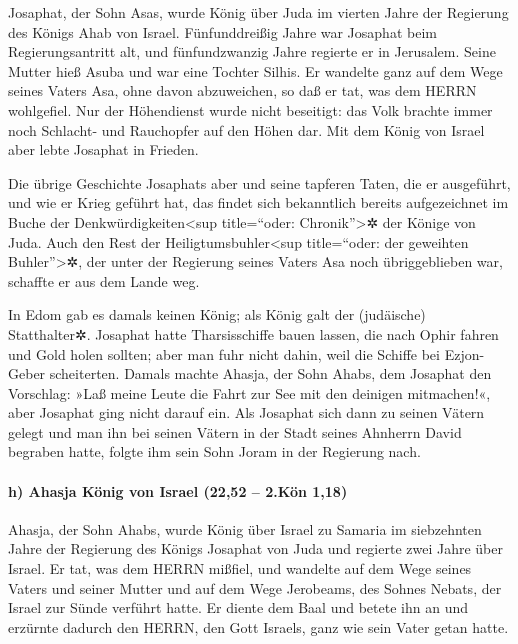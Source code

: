 Josaphat, der Sohn Asas, wurde König über Juda im vierten
Jahre der Regierung des Königs Ahab von Israel.
Fünfunddreißig Jahre war Josaphat beim Regierungsantritt
alt, und fünfundzwanzig Jahre regierte er in Jerusalem. Seine Mutter
hieß Asuba und war eine Tochter Silhis. Er wandelte ganz
auf dem Wege seines Vaters Asa, ohne davon abzuweichen, so daß er tat,
was dem HERRN wohlgefiel. Nur der Höhendienst wurde nicht
beseitigt: das Volk brachte immer noch Schlacht- und Rauchopfer auf den
Höhen dar. Mit dem König von Israel aber lebte Josaphat
in Frieden.

Die übrige Geschichte Josaphats aber und seine tapferen
Taten, die er ausgeführt, und wie er Krieg geführt hat, das findet sich
bekanntlich bereits aufgezeichnet im Buche der
Denkwürdigkeiten\textless sup title=``oder: Chronik''\textgreater✲ der
Könige von Juda. Auch den Rest der
Heiligtumsbuhler\textless sup title=``oder: der geweihten
Buhler''\textgreater✲, der unter der Regierung seines Vaters Asa noch
übriggeblieben war, schaffte er aus dem Lande weg.

In Edom gab es damals keinen König; als König galt der
(judäische) Statthalter✲. Josaphat hatte Tharsisschiffe
bauen lassen, die nach Ophir fahren und Gold holen sollten; aber man
fuhr nicht dahin, weil die Schiffe bei Ezjon-Geber scheiterten.
Damals machte Ahasja, der Sohn Ahabs, dem Josaphat den
Vorschlag: »Laß meine Leute die Fahrt zur See mit den deinigen
mitmachen!«, aber Josaphat ging nicht darauf ein. Als
Josaphat sich dann zu seinen Vätern gelegt und man ihn bei seinen Vätern
in der Stadt seines Ahnherrn David begraben hatte, folgte ihm sein Sohn
Joram in der Regierung nach.

\hypertarget{h-ahasja-kuxf6nig-von-israel-2252-2.kuxf6n-118}{%
\paragraph{h) Ahasja König von Israel (22,52 -- 2.Kön
1,18)}\label{h-ahasja-kuxf6nig-von-israel-2252-2.kuxf6n-118}}

Ahasja, der Sohn Ahabs, wurde König über Israel zu
Samaria im siebzehnten Jahre der Regierung des Königs Josaphat von Juda
und regierte zwei Jahre über Israel. Er tat, was dem
HERRN mißfiel, und wandelte auf dem Wege seines Vaters und seiner Mutter
und auf dem Wege Jerobeams, des Sohnes Nebats, der Israel zur Sünde
verführt hatte. Er diente dem Baal und betete ihn an und
erzürnte dadurch den HERRN, den Gott Israels, ganz wie sein Vater getan
hatte.
